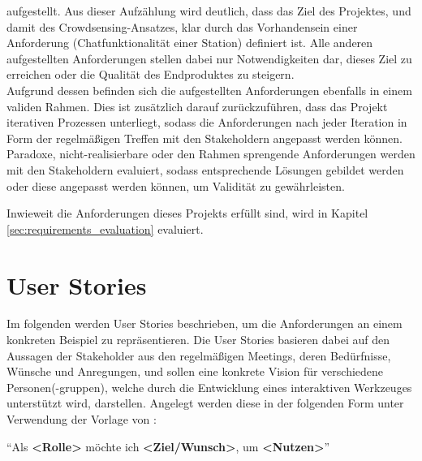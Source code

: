 aufgestellt. Aus dieser Aufzählung wird deutlich, dass das Ziel des Projektes, und damit des Crowdsensing-Ansatzes, klar durch das Vorhandensein einer Anforderung (Chatfunktionalität einer Station) definiert ist. Alle anderen aufgestellten Anforderungen stellen dabei nur Notwendigkeiten dar, dieses Ziel zu erreichen oder die Qualität des Endproduktes zu steigern. \\ Aufgrund dessen befinden sich die aufgestellten Anforderungen ebenfalls in einem validen Rahmen. Dies ist zusätzlich darauf zurückzuführen, dass das Projekt iterativen Prozessen unterliegt, sodass die Anforderungen nach jeder Iteration in Form der regelmäßigen Treffen mit den Stakeholdern angepasst werden können. Paradoxe, nicht-realisierbare oder den Rahmen sprengende Anforderungen werden mit den Stakeholdern evaluiert, sodass entsprechende Lösungen gebildet werden oder diese angepasst werden können, um Validität zu gewährleisten.

Inwieweit die Anforderungen dieses Projekts erfüllt sind, wird in Kapitel \ref{sec:requirements_evaluation} evaluiert. 

\section{User Stories}
Im folgenden werden User Stories beschrieben, um die Anforderungen an einem konkreten Beispiel zu repräsentieren. Die User Stories basieren dabei auf den Aussagen der Stakeholder aus den regelmäßigen Meetings, deren Bedürfnisse, Wünsche und Anregungen, und sollen eine konkrete Vision für verschiedene Personen(-gruppen), welche durch die Entwicklung eines interaktiven Werkzeuges unterstützt wird, darstellen. Angelegt werden diese in der folgenden Form unter Verwendung der Vorlage von \cite{AmblerUserStory}:

\enquote{Als \textbf{<Rolle>} möchte ich \textbf{<Ziel/Wunsch>}, um \textbf{<Nutzen>}}

